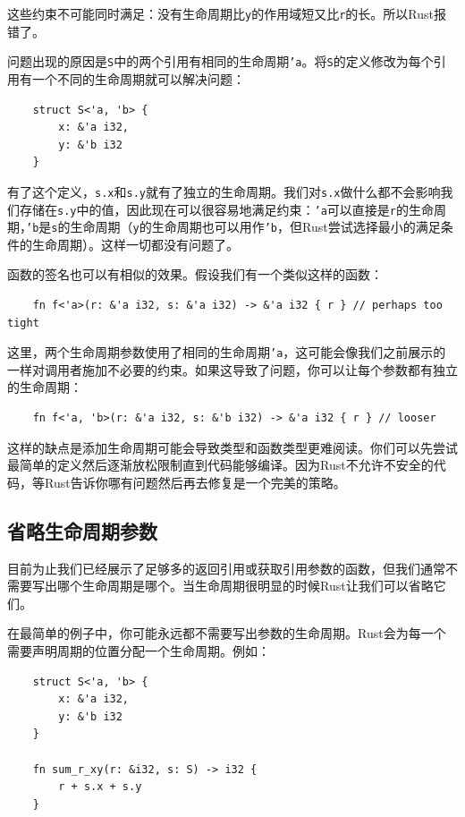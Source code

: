 这些约束不可能同时满足：没有生命周期比\texttt{y}的作用域短又比\texttt{r}的长。所以Rust报错了。

问题出现的原因是\texttt{S}中的两个引用有相同的生命周期\texttt{'a}。将\texttt{S}的定义修改为每个引用有一个不同的生命周期就可以解决问题：
\begin{verbatim}
    struct S<'a, 'b> {
        x: &'a i32,
        y: &'b i32
    }
\end{verbatim}

有了这个定义，\texttt{s.x}和\texttt{s.y}就有了独立的生命周期。我们对\texttt{s.x}做什么都不会影响我们存储在\texttt{s.y}中的值，因此现在可以很容易地满足约束：\texttt{'a}可以直接是\texttt{r}的生命周期，\texttt{'b}是\texttt{s}的生命周期（\texttt{y}的生命周期也可以用作\texttt{'b}，但Rust尝试选择最小的满足条件的生命周期）。这样一切都没有问题了。

函数的签名也可以有相似的效果。假设我们有一个类似这样的函数：
\begin{verbatim}
    fn f<'a>(r: &'a i32, s: &'a i32) -> &'a i32 { r } // perhaps too tight
\end{verbatim}

这里，两个生命周期参数使用了相同的生命周期\texttt{'a}，这可能会像我们之前展示的一样对调用者施加不必要的约束。如果这导致了问题，你可以让每个参数都有独立的生命周期：
\begin{verbatim}
    fn f<'a, 'b>(r: &'a i32, s: &'b i32) -> &'a i32 { r } // looser
\end{verbatim}

这样的缺点是添加生命周期可能会导致类型和函数类型更难阅读。你们可以先尝试最简单的定义然后逐渐放松限制直到代码能够编译。因为Rust不允许不安全的代码，等Rust告诉你哪有问题然后再去修复是一个完美的策略。

\subsection{省略生命周期参数}
目前为止我们已经展示了足够多的返回引用或获取引用参数的函数，但我们通常不需要写出哪个生命周期是哪个。当生命周期很明显的时候Rust让我们可以省略它们。

在最简单的例子中，你可能永远都不需要写出参数的生命周期。Rust会为每一个需要声明周期的位置分配一个生命周期。例如：
\begin{verbatim}
    struct S<'a, 'b> {
        x: &'a i32,
        y: &'b i32
    }

    fn sum_r_xy(r: &i32, s: S) -> i32 {
        r + s.x + s.y
    }
\end{verbatim}


